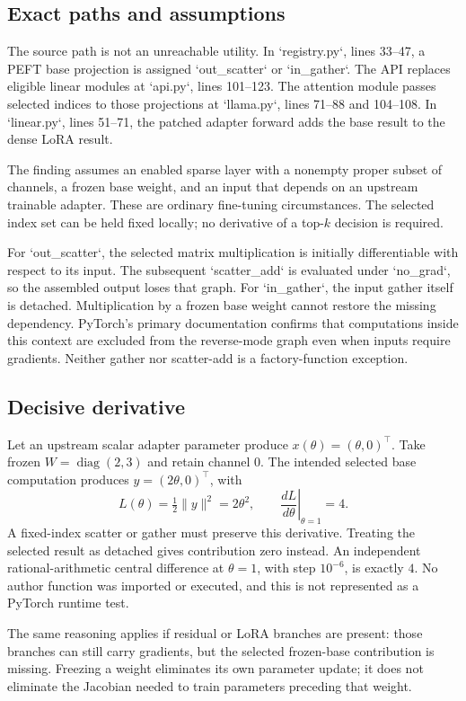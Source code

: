 \documentclass[10pt]{article}
\begin{document}
\subsection*{Exact paths and assumptions}
The source path is not an unreachable utility. In `registry.py`, lines 33–47, a PEFT base projection is assigned `out\_scatter` or `in\_gather`. The API replaces eligible linear modules at `api.py`, lines 101–123. The attention module passes selected indices to those projections at `llama.py`, lines 71–88 and 104–108. In `linear.py`, lines 51–71, the patched adapter forward adds the base result to the dense LoRA result.\par
The finding assumes an enabled sparse layer with a nonempty proper subset of channels, a frozen base weight, and an input that depends on an upstream trainable adapter. These are ordinary fine-tuning circumstances. The selected index set can be held fixed locally; no derivative of a top-\(k\) decision is required.\par
For `out\_scatter`, the selected matrix multiplication is initially differentiable with respect to its input. The subsequent `scatter\_add` is evaluated under `no\_grad`, so the assembled output loses that graph. For `in\_gather`, the input gather itself is detached. Multiplication by a frozen base weight cannot restore the missing dependency. PyTorch’s primary documentation confirms that computations inside this context are excluded from the reverse-mode graph even when inputs require gradients. Neither gather nor scatter-add is a factory-function exception.\par
\subsection*{Decisive derivative}
Let an upstream scalar adapter parameter produce \(x(\theta)=(\theta,0)^\top\). Take frozen \(W=\operatorname{diag}(2,3)\) and retain channel 0. The intended selected base computation produces \(y=(2\theta,0)^\top\), with \[L(\theta)=\tfrac12\|y\|^2=2\theta^2,\qquad
 \left.\frac{dL}{d\theta}\right|_{\theta=1}=4.\] A fixed-index scatter or gather must preserve this derivative. Treating the selected result as detached gives contribution zero instead. An independent rational-arithmetic central difference at \(\theta=1\), with step \(10^{-6}\), is exactly \(4\). No author function was imported or executed, and this is not represented as a PyTorch runtime test.\par
The same reasoning applies if residual or LoRA branches are present: those branches can still carry gradients, but the selected frozen-base contribution is missing. Freezing a weight eliminates its own parameter update; it does not eliminate the Jacobian needed to train parameters preceding that weight.\par
\end{document}
